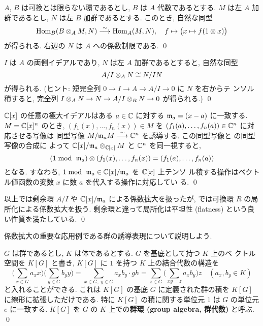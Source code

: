 \documentclass[12pt,twoside]{jarticle}
\begin{document}
\begin{question}
  $A$, $B$ は可換とは限らない環であるとし, $B$ は $A$ 代数であるとする. 
  $M$ は左 $A$ 加群であるとし, $N$ は左 $B$ 加群であるとする. 
  このとき, 自然な同型
  \begin{equation*}
    \mathop{\mathrm{Hom}}\nolimits_B(B\otimes_A M, N) \overset\sim\longrightarrow \mathop{\mathrm{Hom}}\nolimits_A(M, N), 
    \quad f \mapsto \big(x \mapsto f(1\otimes x)\big)
  \end{equation*}
  が得られる. 右辺の $N$ は $A$ への係数制限である. \qed
\end{question}

\begin{question}\label{q:tensor-R/I}
  $I$ は $A$ の両側イデアルであり, $N$ は左 $A$ 加群であるとすると,
  自然な同型
  \begin{equation*}
    A/I\otimes_A N \cong N/IN
  \end{equation*}
  が得られる.  (ヒント: 短完全列 $0\to I\to A\to A/I\to 0$ に $N$ を右からテ
  ンソル積すると, 完全列 $I\otimes_A N\to N \to A/I\otimes_R N\to 0$ が得られる.) \qed
\end{question}

\begin{question}
  ${\mathbb C}[x]$ の任意の極大イデアルはある $a\in{\mathbb C}$ に対する ${\mathfrak m}_a = (x - a)$
  に一致する.  $M = {\mathbb C}[x]^n$ のとき,  $(f_1(x),\ldots,f_n(x))\in M$ 
  を $(f_1(a),\ldots,f_n(a))\in{\mathbb C}^n$ に対応させる写像は
  同型写像 $M/{\mathfrak m}_a M\overset\sim\longrightarrow {\mathbb C}^n$ を誘導する. 
  この同型写像と  の同型写像の合成に
  よって ${\mathbb C}[x]/{\mathfrak m}_a\otimes_{{\mathbb C}[x]}M$ と ${\mathbb C}^n$ を同一視すると,
  \begin{equation*}
    (1\bmod~{\mathfrak m}_a)\otimes(f_1(x),\ldots,f_n(x)) = (f_1(a),\ldots,f_n(a))
  \end{equation*}
  となる.  すなわち, $1\bmod~{\mathfrak m}_a\in{\mathbb C}[x]/{\mathfrak m}_a$ を ${\mathbb C}[x]$ 上テンソ
  ル積する操作はベクトル値函数の変数 $x$ に数 $a$ を代入する操作に対応してい
  る. \qed
\end{question}

\begin{guide}
  以上では剰余環 $A/I$ や ${\mathbb C}[x]/{\mathfrak m}_a$ による係数拡大を扱ったが, 
  では可換環 $R$ の局所化による係数拡大を扱う. 
  剰余環と違って局所化は平坦性 (flatness) という良い性質を満たしている. \qed
\end{guide}

係数拡大の重要な応用例である群の誘導表現について説明しよう.

\begin{definition}[群環]
  $G$ は群であるとし, $K$ は体であるとする. $G$ を基底として持つ $K$ 上のベ
  クトル空間を $K[G]$ と書き, $K[G]$ に $1$ を持つ $K$ 上の結合代数の構造を
  \begin{equation*}
    \Big(\sum_{x\in G} a_x x\Big)
    \Big(\sum_{y\in G} b_y y\Big)
    =
    \sum_{x\in G,\;y\in G} a_x b_y \cdot gh
    =
    \sum_{z\in G} \Big(\sum_{xy=z} a_x b_y\Big) z
    \quad
    (a_x,b_y\in K)
  \end{equation*}
  と入れることができる. これは $K[G]$ の基底 $G$ に定義された群の積を $K[G]$ 
  に線形に拡張しただけである. 
  特に $K[G]$ の積に関する単位元 $1$ は $G$ の単位元 $e$ に一致する.
  $K[G]$ を $G$ の $K$ 上での{\bf 群環 (group algebra, 群代数)} と呼ぶ.
  \qed
\end{definition}
\end{document}

